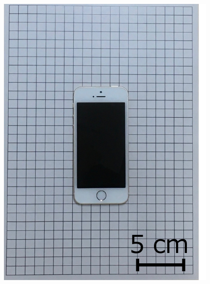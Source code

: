 \begin{figure}[H]
\begin{minipage}{0.19\columnwidth}
        \includegraphics[clip, width=\linewidth]{figure/chapter4/cellphone}
    \end{minipage}
    \begin{minipage}{0.19\columnwidth}
        \centering

\end{minipage}
\end{figure}
